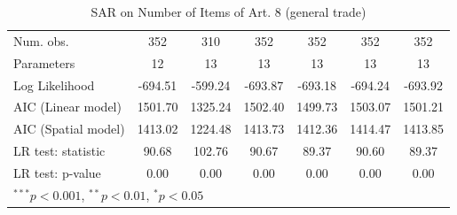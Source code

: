 \begin{table}[!h]
\begin{center}
\begin{tabular}{l c c c c c c }
\midrule
Num. obs.               & 352          & 310          & 352          & 352          & 352          & 352          \\
Parameters              & 12           & 13           & 13           & 13           & 13           & 13           \\
Log Likelihood          & -694.51      & -599.24      & -693.87      & -693.18      & -694.24      & -693.92      \\
AIC (Linear model)      & 1501.70      & 1325.24      & 1502.40      & 1499.73      & 1503.07      & 1501.21      \\
AIC (Spatial model)     & 1413.02      & 1224.48      & 1413.73      & 1412.36      & 1414.47      & 1413.85      \\
LR test: statistic      & 90.68        & 102.76       & 90.67        & 89.37        & 90.60        & 89.37        \\
LR test: p-value        & 0.00         & 0.00         & 0.00         & 0.00         & 0.00         & 0.00         \\
\bottomrule
\multicolumn{7}{l}{\scriptsize{$^{***}p<0.001$, $^{**}p<0.01$, $^*p<0.05$}}
\end{tabular}
\caption{SAR on Number of Items of Art. 8 (general trade)}
\label{table:coefficients}
\end{center}
\end{table}
